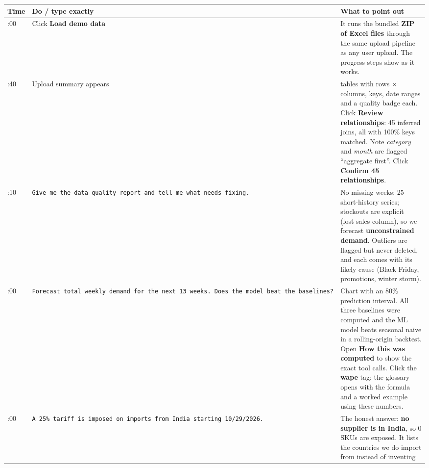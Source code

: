 \documentclass[
]{article}
\newcounter{none} %
\begin{document}
{\def\LTcaptype{none} %
\begin{longtable}[]{@{}
  >{\raggedright\arraybackslash}p{}
  >{\raggedright\arraybackslash}p{}
  >{\raggedright\arraybackslash}p{}@{}}
\toprule\noalign{}
\begin{minipage}[b]{\linewidth}\raggedright
Time
\end{minipage} & \begin{minipage}[b]{\linewidth}\raggedright
Do / type exactly
\end{minipage} & \begin{minipage}[b]{\linewidth}\raggedright
What to point out
\end{minipage} \\
\midrule\noalign{}
\endhead
\bottomrule\noalign{}
\endlastfoot
0:00 & Click \textbf{Load demo data} & It runs the bundled \textbf{ZIP
of Excel files} through the same upload pipeline as any user upload. The
progress steps show as it works. \\
0:40 & Upload summary appears & 23 tables with rows × columns, keys,
date ranges and a quality badge each. Click \textbf{Review
relationships}: 45 inferred joins, all with 100\% keys matched. Note
\emph{category} and \emph{month} are flagged ``aggregate first''. Click
\textbf{Confirm 45 relationships}. \\
1:10 &
\texttt{Give\ me\ the\ data\ quality\ report\ and\ tell\ me\ what\ needs\ fixing.}
& No missing weeks; 25 short-history series; stockouts are explicit
(lost-sales column), so we forecast \textbf{unconstrained demand}.
Outliers are flagged but never deleted, and each comes with its likely
cause (Black Friday, promotions, winter storm). \\
2:00 &
\texttt{Forecast\ total\ weekly\ demand\ for\ the\ next\ 13\ weeks.\ Does\ the\ model\ beat\ the\ baselines?}
& Chart with an 80\% prediction interval. All three baselines were
computed and the ML model beats seasonal naive in a rolling-origin
backtest. Open \textbf{How this was computed} to show the exact tool
calls. Click the \textbf{wape} tag: the glossary opens with the formula
and a worked example using these numbers. \\
3:00 &
\texttt{A\ 25\%\ tariff\ is\ imposed\ on\ imports\ from\ India\ starting\ 10/29/2026.}
& The honest answer: \textbf{no supplier is in India}, so 0 SKUs are
exposed. It lists the countries we do import from instead of inventing

\end{longtable}}
\end{document}
